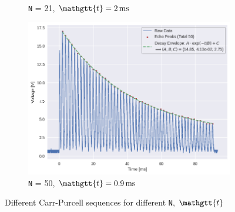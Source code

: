 \documentclass[%
 reprint,
 amsmath,amssymb,
 aps,
]{revtex4-2}
\newcommand{\taucode}{\mathgtt{t}}
\begin{document}
\begin{figure}[hbpt]
\begin{subfigure}{0.3\linewidth}
        \caption{\texttt{N} = 21, $\taucode = \SI{2}{\milli\second}$}
    \end{subfigure}
    \begin{subfigure}{0.3\linewidth}
        \includegraphics[width = 0.8\linewidth]{figs/purcell/data4.png}
        \caption{\texttt{N} = 50, $\taucode = \SI{0.9}{\milli\second}$}
    \end{subfigure}
    \caption{Different Carr-Purcell sequences for different \texttt{N}, $\taucode$}\label{fig:experimental-purcell}
\end{figure}





\newpage





\nocite{*}


\end{document}
